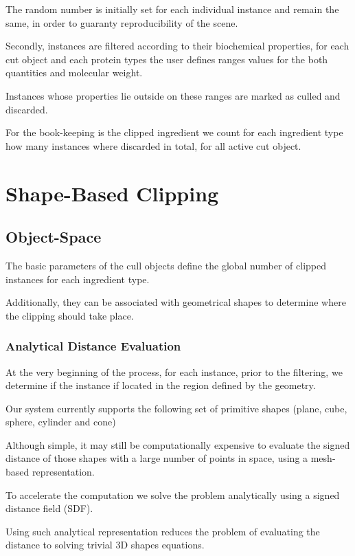 The random number is initially set for each individual instance and remain the same, in order to guaranty reproducibility of the scene.

Secondly, instances are filtered according to their biochemical properties, for each cut object and each protein types the user defines ranges values for the both quantities and molecular weight.

Instances whose properties lie outside on these ranges are marked as culled and discarded.

For the book-keeping is the clipped ingredient we count for each ingredient type how many instances where discarded in total, for all active cut object.



\section{Shape-Based Clipping}

\subsection{Object-Space}

The basic parameters of the cull objects define the global number of clipped instances for each ingredient type.

Additionally, they can be associated with geometrical shapes to determine where the clipping should take place.


\subsubsection{Analytical Distance Evaluation}

At the very beginning of the process, for each instance, prior to the filtering, we determine if the instance if located in the region defined by the geometry.

Our system currently supports the following set of primitive shapes (plane, cube, sphere, cylinder and cone)

Although simple, it may still be computationally expensive to evaluate the signed distance of those shapes with a large number of points in space, using a mesh-based representation.

To accelerate the computation we solve the problem analytically using a signed distance field (SDF).

Using such analytical representation reduces the problem of evaluating the distance to solving trivial 3D shapes equations.

